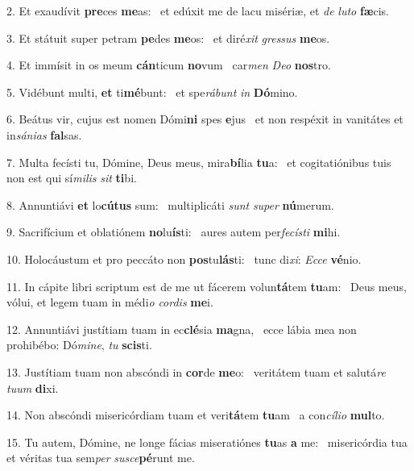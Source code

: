 2. Et exaudívit \textbf{pre}ces \textbf{me}as: \ast\  et edúxit me de lacu misériæ, et \textit{de} \textit{lu}\textit{to} \textbf{fæ}cis.\

3. Et státuit super petram \textbf{pe}des \textbf{me}os: \ast\  et diré\textit{xit} \textit{gres}\textit{sus} \textbf{me}os.\

4. Et immísit in os meum \textbf{cán}ticum \textbf{no}vum \ast\  car\textit{men} \textit{De}\textit{o} \textbf{nos}tro.\

5. Vidébunt multi, \textbf{et} ti\textbf{mé}bunt: \ast\  et spe\textit{rá}\textit{bunt} \textit{in} \textbf{Dó}mino.\

6. Beátus vir, cujus est nomen Dómi\textbf{ni} spes \textbf{e}jus \ast\  et non respéxit in vanitátes et in\textit{sá}\textit{ni}\textit{as} \textbf{fal}sas.\

7. Multa fecísti tu, Dómine, Deus meus, mira\textbf{bí}lia \textbf{tu}a: \ast\  et cogitatiónibus tuis non est qui sí\textit{mi}\textit{lis} \textit{sit} \textbf{ti}bi.\

8. Annuntiávi \textbf{et} lo\textbf{cú}\textbf{tus} sum: \ast\  multiplicáti \textit{sunt} \textit{su}\textit{per} \textbf{nú}merum.\

9. Sacrifícium et oblatiónem \textbf{no}lu\textbf{ís}ti: \ast\  aures autem per\textit{fe}\textit{cís}\textit{ti} \textbf{mi}hi.\

10. Holocáustum et pro peccáto non \textbf{pos}tu\textbf{lás}ti: \ast\  tunc di\textit{xi}: \textit{Ec}\textit{ce} \textbf{vé}nio.\

11. In cápite libri scriptum est de me ut fácerem volun\textbf{tá}tem \textbf{tu}am: \ast\  Deus meus, vólui, et legem tuam in médi\textit{o} \textit{cor}\textit{dis} \textbf{me}i.\

12. Annuntiávi justítiam tuam in ec\textbf{clé}sia \textbf{ma}gna, \ast\  ecce lábia mea non prohibébo: Dó\textit{mi}\textit{ne}, \textit{tu} \textbf{scis}ti.\

13. Justítiam tuam non abscóndi in \textbf{cor}de \textbf{me}o: \ast\  veritátem tuam et salutá\textit{re} \textit{tu}\textit{um} \textbf{di}xi.\

14. Non abscóndi misericórdiam tuam et veri\textbf{tá}tem \textbf{tu}am \ast\  a con\textit{cí}\textit{li}\textit{o} \textbf{mul}to.\

15. Tu autem, Dómine, ne longe fácias miseratiónes \textbf{tu}as \textbf{a} me: \ast\  misericórdia tua et véritas tua sem\textit{per} \textit{su}\textit{sce}\textbf{pé}runt me.\

